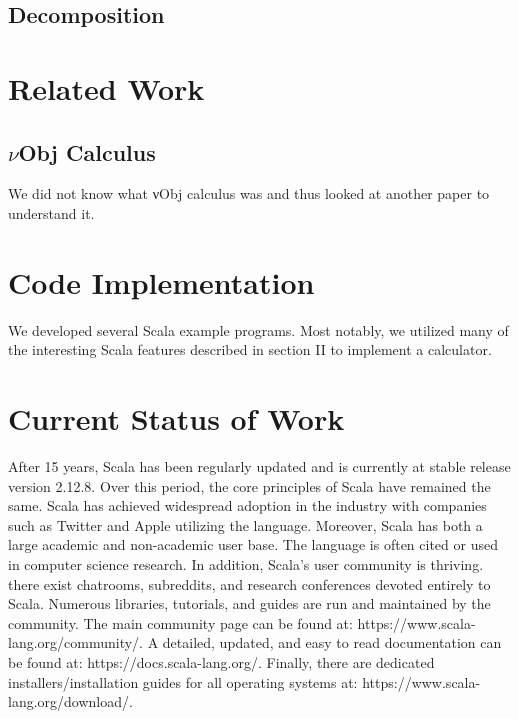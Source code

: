 \documentclass[jou,apacite]{IEEEtran}
\begin{document}
\subsection{Decomposition}

\section{Related Work}

\subsection{$\nu$Obj Calculus}
We did not know what νObj calculus was and thus looked at another paper to
understand it.

\section{Code Implementation}
We developed several Scala example programs. Most notably, we utilized many of
the interesting Scala features described in section II to implement a
calculator.

\section{Current Status of Work}
After 15 years, Scala has been regularly updated and is currently at stable
release version 2.12.8. Over this period, the core principles of Scala have
remained the same. Scala has achieved widespread adoption in the industry with
companies such as Twitter and Apple utilizing the language. Moreover, Scala has
both a large academic and non-academic user base. The language is often cited or
used in computer science research. In addition, Scala's user community is
thriving. there exist chatrooms, subreddits, and research conferences devoted
entirely to Scala. Numerous libraries, tutorials, and guides are run and
maintained by the community. The main community page can be found at:
https://www.scala-lang.org/community/. A detailed, updated, and easy to read
documentation can be found at: https://docs.scala-lang.org/. Finally, there are
dedicated installers/installation guides for all operating systems at:
https://www.scala-lang.org/download/.




\end{document}
